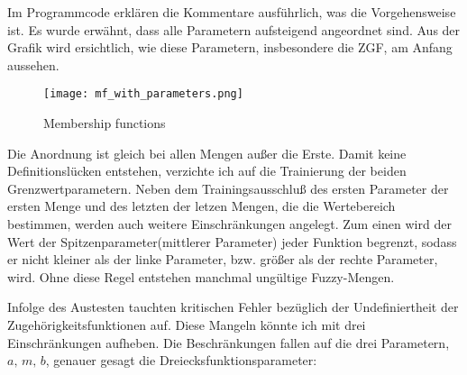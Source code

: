 %
%
%

    Im Programmcode erklären die Kommentare ausführlich, was die
Vorgehensweise ist. Es wurde erwähnt, dass alle Parametern aufsteigend
angeordnet sind. Aus der Grafik wird ersichtlich, wie diese Parametern,
insbesondere die ZGF, am Anfang aussehen.

\begin{figure}
\centering
\texttt{[image: mf\_with\_parameters.png]}
\caption{Membership functions}
\end{figure}

Die Anordnung ist gleich bei allen Mengen außer die Erste. Damit keine
Definitionslücken entstehen, verzichte ich auf die Trainierung der
beiden Grenzwertparametern. Neben dem Trainingsausschluß des ersten
Parameter der ersten Menge und des letzten der letzen Mengen, die die
Wertebereich bestimmen, werden auch weitere Einschränkungen angelegt.
Zum einen wird der Wert der Spitzenparameter(mittlerer Parameter) jeder
Funktion begrenzt, sodass er nicht kleiner als der linke Parameter, bzw.
größer als der rechte Parameter, wird. Ohne diese Regel entstehen
manchmal ungültige Fuzzy-Mengen.

Infolge des Austesten tauchten kritischen Fehler bezüglich der
Undefiniertheit der Zugehörigkeitsfunktionen auf. Diese Mangeln könnte
ich mit drei Einschränkungen aufheben. Die Beschränkungen fallen auf die
drei Parametern, \(\textit{a, m, b}\), genauer gesagt die
Dreiecksfunktionsparameter:

